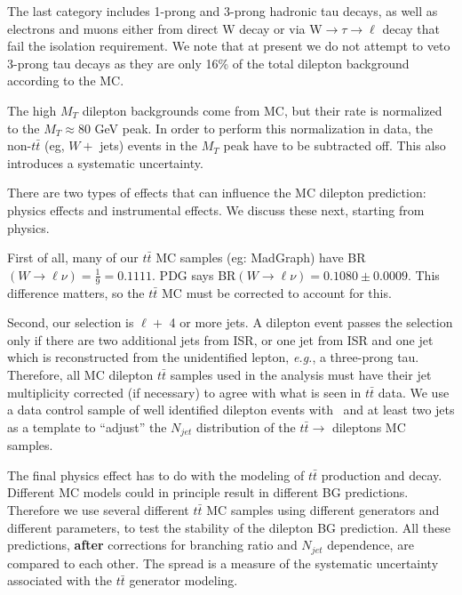 The last category includes 1-prong and 3-prong hadronic tau decays, as well as electrons and muons either from direct W decay or via W$\to\tau\to\ell$ decay 
that fail the isolation requirement.
We note that at present we do not attempt to veto 3-prong tau decays as they are only 16\% of the total dilepton background according to the MC.

The high $M_T$ dilepton backgrounds come from MC, but their rate is normalized to the 
$M_T \approx 80$ GeV peak.  In order to perform this normalization in
data, the non-$t\bar{t}$ (eg, $W +$ jets)
events in the $M_T$ peak have to be subtracted off.  This also introduces a systematic uncertainty.

There are two types of effects that can influence the MC dilepton prediction: physics effects 
and instrumental effects.  We discuss these next, starting from physics.

First of all, many of our $t\bar{t}$ MC samples (eg: MadGraph) have
 BR$(W \to \ell \nu)=\frac{1}{9} = 0.1111$.
PDG says BR$(W \to \ell \nu) = 0.1080 \pm 0.0009$.  This difference matters, so the $t\bar{t}$ MC 
must be corrected to account for this.

Second, our selection is $\ell +$ 4 or more jets.  A dilepton event passes the selection only if there are 
two additional jets from ISR, or one jet from ISR and one jet which is reconstructed from the 
unidentified lepton, {\it e.g.}, a three-prong tau.  Therefore, all MC dilepton $t\bar{t}$ samples used
in the analysis must have their jet multiplicity corrected (if necessary) to agree with what is 
seen in $t\bar{t}$ data.  We use a data control sample of well identified dilepton events with
\met\ and at least two jets as a template to ``adjust'' the $N_{jet}$ distribution of the $t\bar{t} \to$
dileptons MC samples.

The final physics effect has to do with the modeling of $t\bar{t}$ production and decay.  Different
MC models could in principle result in different BG predictions.  Therefore we use several different 
$t\bar{t}$ MC samples using different generators and different parameters, to test the stability
of the dilepton BG prediction.  All these predictions, {\bf after} corrections for branching ratio
and $N_{jet}$ dependence, are compared to each other.  The spread is a measure of the systematic
uncertainty associated with the $t\bar{t}$ generator modeling.

